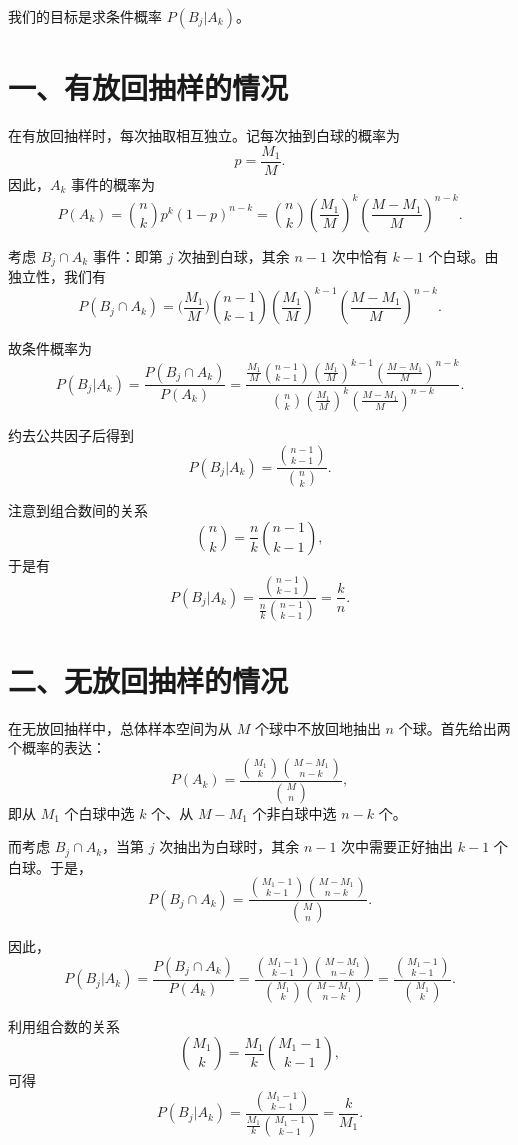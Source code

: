 \documentclass[UTF-8,twoside,cs4size]{ctexart}
\begin{document}
我们的目标是求条件概率 $P(B_j|A_k)$。

\bigskip

\section*{一、有放回抽样的情况}

在有放回抽样时，每次抽取相互独立。记每次抽到白球的概率为
\[
p = \frac{M_1}{M}.
\]
因此，$A_k$ 事件的概率为
\[
P(A_k) = \binom{n}{k} p^k (1-p)^{n-k} = \binom{n}{k} \left(\frac{M_1}{M}\right)^{k} \left(\frac{M-M_1}{M}\right)^{n-k}.
\]

考虑 $B_j \cap A_k$ 事件：即第 $j$ 次抽到白球，其余 $n-1$ 次中恰有 $k-1$ 个白球。由独立性，我们有
\[
P(B_j \cap A_k) = \biggl(\frac{M_1}{M}\biggr) \binom{n-1}{k-1} \left(\frac{M_1}{M}\right)^{k-1} \left(\frac{M-M_1}{M}\right)^{n-k}.
\]

故条件概率为
\[
P(B_j|A_k) = \frac{P(B_j \cap A_k)}{P(A_k)} = \frac{\displaystyle \frac{M_1}{M} \binom{n-1}{k-1} \left(\frac{M_1}{M}\right)^{k-1} \left(\frac{M-M_1}{M}\right)^{n-k}}{\displaystyle \binom{n}{k} \left(\frac{M_1}{M}\right)^{k} \left(\frac{M-M_1}{M}\right)^{n-k}}.
\]

约去公共因子后得到
\[
P(B_j|A_k) = \frac{\binom{n-1}{k-1}}{\binom{n}{k}}.
\]

注意到组合数间的关系
\[
\binom{n}{k} = \frac{n}{k}\binom{n-1}{k-1},
\]
于是有
\[
P(B_j|A_k) = \frac{\binom{n-1}{k-1}}{\frac{n}{k}\binom{n-1}{k-1}} = \frac{k}{n}.
\]

\bigskip

\section*{二、无放回抽样的情况}

在无放回抽样中，总体样本空间为从 $M$ 个球中不放回地抽出 $n$ 个球。首先给出两个概率的表达：
\[
P(A_k) = \frac{\binom{M_1}{k}\binom{M-M_1}{n-k}}{\binom{M}{n}},
\]
即从 $M_1$ 个白球中选 $k$ 个、从 $M-M_1$ 个非白球中选 $n-k$ 个。

而考虑 $B_j \cap A_k$，当第 $j$ 次抽出为白球时，其余 $n-1$ 次中需要正好抽出 $k-1$ 个白球。于是，
\[
P(B_j \cap A_k) = \frac{\binom{M_1-1}{k-1}\binom{M-M_1}{n-k}}{\binom{M}{n}}.
\]

因此，
\[
P(B_j|A_k) = \frac{P(B_j \cap A_k)}{P(A_k)} = \frac{\binom{M_1-1}{k-1}\binom{M-M_1}{n-k}}{\binom{M_1}{k}\binom{M-M_1}{n-k}} = \frac{\binom{M_1-1}{k-1}}{\binom{M_1}{k}}.
\]

利用组合数的关系
\[
\binom{M_1}{k} = \frac{M_1}{k}\binom{M_1-1}{k-1},
\]
可得
\[
P(B_j|A_k) = \frac{\binom{M_1-1}{k-1}}{\frac{M_1}{k}\binom{M_1-1}{k-1}} = \frac{k}{M_1}.
\]
\end{document}
